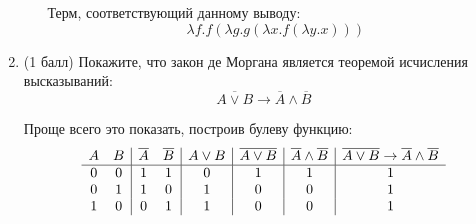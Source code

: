 \begin{enumerate}
\begin{itemize}
\begin{solution}
      \begin{prooftree}
      \end{prooftree}
      Терм, соответствующий данному выводу:
      \begin{equation}
        \lambda f. f (\lambda g. g (\lambda x . f (\lambda y . x)))
      \end{equation}
    \end{solution}
  \end{itemize}
  \item (1 балл) Покажите, что закон де Моргана является теоремой исчисления высказываний:
  $$\overline{A \lor B} \rightarrow \overline{A} \land \overline{B}$$
  \begin{solution}
    Проще всего это показать, построив булеву функцию:
    \begin{displaymath}
      \begin{array}{c c|c c|c|c|c|c}
        A & B & \overline{A} & \overline{B} & A \lor B & \overline{A \lor B} & \overline{A} \land \overline{B} & \overline{A \lor B} \rightarrow \overline{A} \land \overline{B}\\
        \hline
        0 & 0 & 1 & 1 & 0 & 1 & 1 & 1\\
        0 & 1 & 1 & 0 & 1 & 0 & 0 & 1\\
        1 & 0 & 0 & 1 & 1 & 0 & 0 & 1\\

\end{array}
\end{displaymath}
\end{solution}
\end{enumerate}
